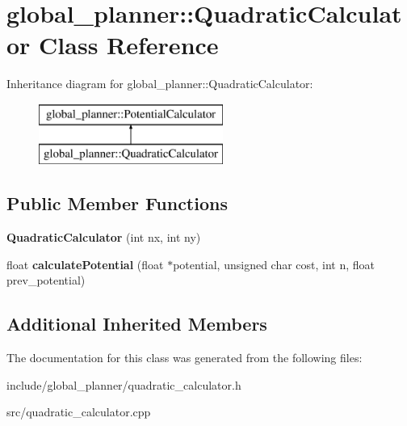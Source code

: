 \hypertarget{classglobal__planner_1_1_quadratic_calculator}{}\section{global\+\_\+planner\+:\+:Quadratic\+Calculator Class Reference}
\label{classglobal__planner_1_1_quadratic_calculator}
Inheritance diagram for global\+\_\+planner\+:\+:Quadratic\+Calculator\+:\begin{figure}[H]
\begin{center}
\leavevmode
\includegraphics[height=2.000000cm]{classglobal__planner_1_1_quadratic_calculator}
\end{center}
\end{figure}
\subsection*{Public Member Functions}
\begin{DoxyCompactItemize}
\item 
\mbox{\label{classglobal__planner_1_1_quadratic_calculator_a4b4e966d382c85d0212121c674587f60}} 
{\bfseries Quadratic\+Calculator} (int nx, int ny)
\item 
\mbox{\label{classglobal__planner_1_1_quadratic_calculator_a5cb0a0126df397b4b5d86d871ddab1d4}} 
float {\bfseries calculate\+Potential} (float $\ast$potential, unsigned char cost, int n, float prev\+\_\+potential)
\end{DoxyCompactItemize}
\subsection*{Additional Inherited Members}


The documentation for this class was generated from the following files\+:\begin{DoxyCompactItemize}
\item 
include/global\+\_\+planner/quadratic\+\_\+calculator.\+h\item 
src/quadratic\+\_\+calculator.\+cpp\end{DoxyCompactItemize}
